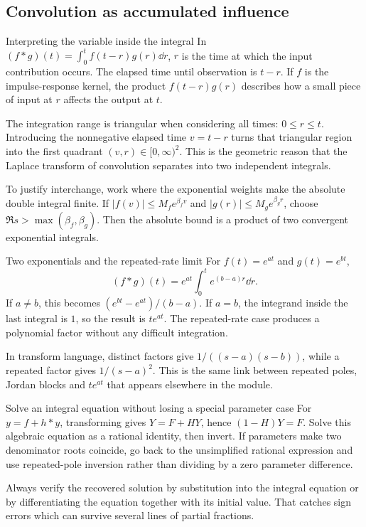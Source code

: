 \subsection{Convolution as accumulated influence}
\begin{concept}{Interpreting the variable inside the integral}
In $(f*g)(t)=\int_0^t f(t-r)g(r)\dd r$, $r$ is the time at which the input contribution occurs. The elapsed time until observation is $t-r$. If $f$ is the impulse-response kernel, the product $f(t-r)g(r)$ describes how a small piece of input at $r$ affects the output at $t$.

The integration range is triangular when considering all times: $0\leq r\leq t$. Introducing the nonnegative elapsed time $v=t-r$ turns that triangular region into the first quadrant $(v,r)\in[0,\infty)^2$. This is the geometric reason that the Laplace transform of convolution separates into two independent integrals.

To justify interchange, work where the exponential weights make the absolute double integral finite. If $|f(v)|\leq M_fe^{\beta_fv}$ and $|g(r)|\leq M_ge^{\beta_gr}$, choose $\Re s>\max(\beta_f,\beta_g)$. Then the absolute bound is a product of two convergent exponential integrals.
\end{concept}
\begin{worked}{Two exponentials and the repeated-rate limit}
For $f(t)=e^{at}$ and $g(t)=e^{bt}$,
\[(f*g)(t)=e^{at}\int_0^t e^{(b-a)r}\dd r.\]
If $a\ne b$, this becomes $(e^{bt}-e^{at})/(b-a)$. If $a=b$, the integrand inside the last integral is $1$, so the result is $te^{at}$. The repeated-rate case produces a polynomial factor without any difficult integration.

In transform language, distinct factors give $1/((s-a)(s-b))$, while a repeated factor gives $1/(s-a)^2$. This is the same link between repeated poles, Jordan blocks and $te^{at}$ that appears elsewhere in the module.
\end{worked}
\begin{method}{Solve an integral equation without losing a special parameter case}
For $y=f+h*y$, transforming gives $Y=F+HY$, hence $(1-H)Y=F$. Solve this algebraic equation as a rational identity, then invert. If parameters make two denominator roots coincide, go back to the unsimplified rational expression and use repeated-pole inversion rather than dividing by a zero parameter difference.

Always verify the recovered solution by substitution into the integral equation or by differentiating the equation together with its initial value. That catches sign errors which can survive several lines of partial fractions.
\end{method}
